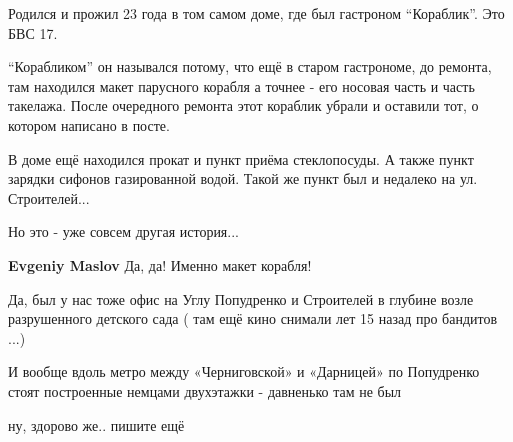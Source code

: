 \begin{itemize}

Родился и прожил 23 года в том самом доме, где был гастроном \enquote{Кораблик}. Это БВС 17.

\enquote{Корабликом} он назывался потому, что ещё в старом гастрономе, до ремонта, там
находился макет парусного корабля а точнее - его носовая часть и часть
такелажа. После очередного ремонта этот кораблик убрали и оставили тот, о
котором написано в посте.

В доме ещё находился прокат и пункт приёма стеклопосуды. А также пункт зарядки
сифонов газированной водой. Такой же пункт был и недалеко на ул. Строителей...

Но это - уже совсем другая история...

\begin{itemize} %
\textbf{Evgeniy Maslov}
Да, да!
Именно макет корабля!
\end{itemize} %


Да, был у нас тоже офис на Углу Попудренко и Строителей в глубине возле
разрушенного детского сада ( там ещё кино снимали лет 15 назад про бандитов ...)

И вообще вдоль метро между «Черниговской» и «Дарницей» по Попудренко стоят
построенные немцами двухэтажки - давненько там не был

ну, здорово же.. пишите ещё

\end{itemize} %
